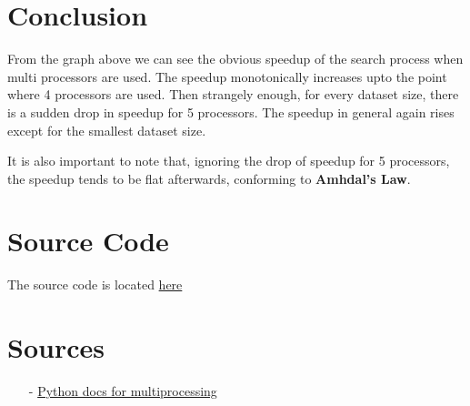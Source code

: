 \documentclass[12pt]{article}
\begin{document}
\section*{Conclusion}
From the graph above we can see the obvious speedup of the search process when multi processors are used.
The speedup monotonically increases upto the point where 4 processors are used. Then strangely enough, for
every dataset size, there is a sudden drop in speedup for 5 processors. The speedup in general again rises
 except for the smallest dataset size. 

It is also important to note that, ignoring the drop of speedup for 5 processors, the speedup tends to be flat afterwards,
conforming to \textbf{Amhdal's Law}.

\section*{Source Code}
The source code is located \href{https://github.com/bewakes/076-mscsk/blob/master/assignments/CS/assignment-Nov-04-2020/search.py}{here}

\section*{Sources}
\begin{itemize}
    \item[-] \href{https://docs.python.org/3.8/library/multiprocessing.html}{Python docs for multiprocessing}
\end{itemize}
\end{document}
